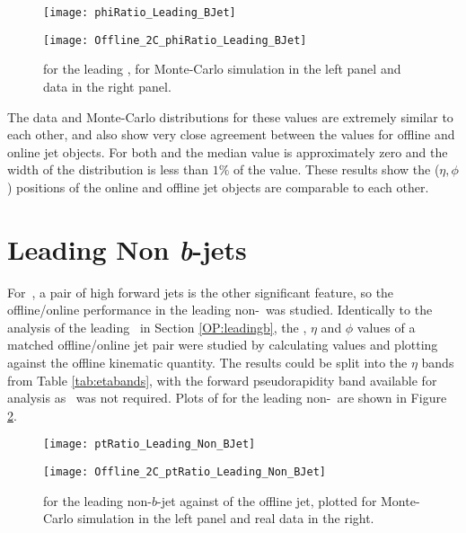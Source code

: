 		\begin{figure}[h]
			\centering
			\begin{minipage}[h]{0.48\linewidth}
				\texttt{[image: phiRatio\_Leading\_BJet]}

			\end{minipage}
			\quad
			\begin{minipage}[h]{0.48\linewidth}
				\texttt{[image: Offline\_2C\_phiRatio\_Leading\_BJet]}
			\end{minipage}
			\caption[\dphph for the leading \bjet\ in data and Monte-Carlo simulations]{\dphph for the leading \bjet, for Monte-Carlo simulation in the left panel and data in the right panel.}
			\label{fig:O:leadingbphi}
		\end{figure}

		\newpage
		The data and Monte-Carlo distributions for these values are extremely similar to each other, and also show very close agreement between the values for offline and online jet objects. For both \dee and \dphph the median value is approximately zero and the width of the distribution is less than $1\%$ of the value. These results show the ($\eta, \phi$) positions of the online and offline jet objects are comparable to each other.


\newpage
\section{Leading Non \textit{b}-jets}
	\label{OP:leadingnonb}

	For \VBFHBB\,, a pair of high \pt forward jets is the other significant feature, so the offline/online performance in the leading non-\bjet\ was studied. Identically to the analysis of the leading \bjet\ in Section \ref{OP:leadingb}, the \pt, $\eta$ and $\phi$ values of a matched offline/online jet pair were studied by calculating \dxx values and plotting against the offline kinematic quantity. The results could be split into the $\eta$ bands from Table \ref{tab:etabands}, with the forward pseudorapidity band available for analysis as \btag\ was not required. Plots of \dptpt for the leading non-\bjet\ are shown in Figure \ref{fig:O:leadingnonbpt}.

	\begin{figure}[h]
		\centering
		\begin{minipage}[h]{0.48\linewidth}
			\texttt{[image: ptRatio\_Leading\_Non\_BJet]}

		\end{minipage}
		\quad
		\begin{minipage}[h]{0.48\linewidth}
			\texttt{[image: Offline\_2C\_ptRatio\_Leading\_Non\_BJet]}
		\end{minipage}
		\caption[\dptpt for the leading \pt non-$b$-jet in data and Monte-Carlo simulations]{\dptpt for the leading \pt non-$b$-jet against \pt of the offline jet, plotted for Monte-Carlo simulation in the left panel and real data in the right.}
		\label{fig:O:leadingnonbpt}
	\end{figure}

